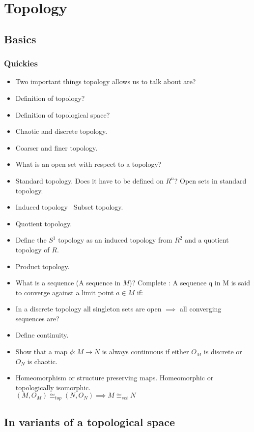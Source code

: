 
\chapter{Topology}
\section{Basics}
\subsection{Quickies}
\begin{itemize}
\item
Two important things topology allows us to talk about are?
\item
Definition of topology?
\item
Definition of topological space?
\item
Chaotic and discrete topology.
\item
Coarser and finer topology.
\item
What is an open set with respect to a topology?
\item
Standard topology. Does it have to be defined on $R^{n}$? Open sets in standard
topology.
\item
Induced topology \ Subset topology.
\item
Quotient topology.
\item
Define the $S^{1}$ topology as an induced topology from $R^{2}$ and a quotient topology of $R$.
\item
Product topology.
\item
What is a sequence (A sequence in $M$)? Complete : A sequence q in M is said to converge against a limit point $a \in M$ if:
\item
In a discrete topology all singleton sets are open $\implies$ all converging sequences are?
\item
Define continuity.
\item
Show that a map $\phi : M \rightarrow N $ is always continuous if either $O_{M}$ is discrete or $O_{N}$ is chaotic.
\item
Homeomorphism or structure preserving maps. Homeomorphic or topologically isomorphic. \\

$(M,O_{M}) \cong_{top} (N,O_{N}) \implies M \cong_{set} N$


\end{itemize}

\section{In variants of a topological space}
